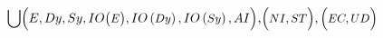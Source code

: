 \documentclass{article}
\begin{document}
\[
\bigcup \Bigl( 
\text{\normalsize $E, Dy, Sy, IO$}
\bigl(
\text{\small $E$}
\bigr)
\text{\normalsize $, IO$}
\left(
\text{\small $Dy$}
\right)
\text{\normalsize $, IO$}
\left(
\text{\small $Sy$}
\right)
\text{\normalsize $, AI$}
\Bigr)
\text{\large $,$} 
\Bigl(
\text{\small $NI, ST$}
\Bigr), 
\Bigl(
\text{\small $EC, UD$}
\Bigr)
\]
\end{document}
